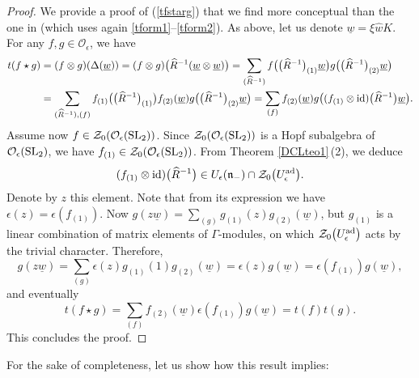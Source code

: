 \documentclass[pdftex]{sigma}
\numberwithin{equation}{section}
\theoremstyle{definition}
\newcommand{\e}{\epsilon}
\newcommand{\Oo}{{\mathcal O}}
\begin{document}
\begin{proof}
We provide a proof of (\ref{tfstarg}) that we find more conceptual than the one in \cite[Lemma~1.5\,(b)]{DC-L} (which uses again \eqref{tform1}--\eqref{tform2}). As above, let us denote $\underline{w}=\xi \hat{w}K$. For any $f,g\in {\mathcal O}_\epsilon$, we have
\begin{align*}
 t(f\star g)& =(f\otimes g)(\Delta(\underline{w}))=(f\otimes g)\big(\widehat{R}^{-1} (\underline{w} \otimes \underline{w})\big)=\sum_{(\widehat{R}^{-1}) }f\big( \big( \widehat{R}^{-1}\big)_{(1) } \underline{w} \big) g\big( \big( \widehat{R}^{-1}\big)_{(2) } \underline{w}\big)\\
&=\sum_{(\widehat{R}^{-1}),(f) }f_{(1)}\big( \big( \widehat{R}^{-1}\big)_{(1) } \big) f_{(2)}(\underline{w} ) g\big( \big( \widehat{R}^{-1}\big)_{(2) } \underline{w}\big)=\sum_{(f) }f_{(2)}(\underline{w} ) g\big( (f_{(1)}\otimes {\rm id} )\big(\widehat{R}^{-1}\big) \underline{w}\big).
\end{align*}
Assume now $f\in \mathcal{Z}_0(\Oo_\e({\rm SL}_2))$. Since $\mathcal{Z}_0(\Oo_\e({\rm SL}_2))$ is a Hopf subalgebra of ${\mathcal O}_{\epsilon}({\rm SL}_2)$, we have \linebreak ${f_{(1)}\in \mathcal{Z}_0(\Oo_\e({\rm SL}_2))}$. From Theorem \ref{DCLteo1}\,(2), we deduce
\[(f_{(1)}\otimes {\rm id} )\big(\widehat{R}^{-1}\big) \in U_\epsilon (\mathfrak{n}_-)\cap \mathcal{Z}_0\big(U_\epsilon^{\rm ad}\big).\]
Denote by $z$ this element. Note that from its expression we have $\epsilon(z)= \epsilon(f_{(1)})$. Now
 $g( z\underline{w})=\sum_{(g)}g_{(1)}(z)g_{(2)}(\underline{w})$, but $g_{(1)}$ is a linear combination of matrix elements of $\Gamma$-modules, on which ${\mathcal Z}_0\big(U_\epsilon^{\rm ad}\big)$ acts by the trivial character. Therefore,
\[ g( z\underline{w})=\sum_{(g)}\epsilon(z)g_{(1)}(1)g_{(2)}(\underline{w})=\epsilon(z)g(\underline{w})= \epsilon(f_{(1)})g(\underline{w}),\]
and eventually
 \[t(f\star g)=\sum_{(f) }f_{(2)}(\underline{w}) \epsilon(f_{(1)}) g(\underline{w})=t(f)t(g).\]
This concludes the proof.
\end{proof}


For the sake of completeness, let us show how this result implies:
\end{document}
